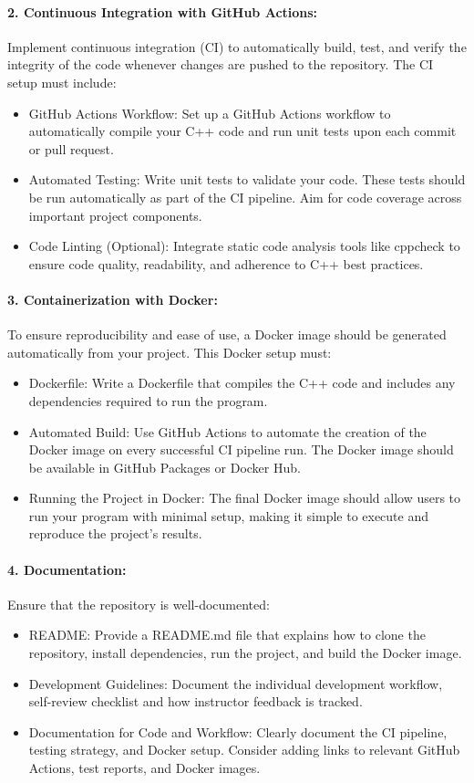 \documentclass[11pt,a4paper]{article}
\begin{document}
\paragraph{2. Continuous Integration with GitHub Actions:}
Implement continuous integration (CI) to automatically build, test, and verify the integrity of the code whenever changes are pushed to the repository. The CI setup must include:
\begin{itemize}
\item GitHub Actions Workflow: Set up a GitHub Actions workflow to automatically compile your C++ code and run unit tests upon each commit or pull request.
\item Automated Testing: Write unit tests to validate your code. These tests should be run automatically as part of the CI pipeline. Aim for code coverage across important project components.
\item Code Linting (Optional): Integrate static code analysis tools like cppcheck to ensure code quality, readability, and adherence to C++ best practices.
\end{itemize}

\paragraph{3. Containerization with Docker:}
To ensure reproducibility and ease of use, a Docker image should be generated automatically from your project. This Docker setup must:
\begin{itemize}
\item Dockerfile: Write a Dockerfile that compiles the C++ code and includes any dependencies required to run the program.
\item Automated Build: Use GitHub Actions to automate the creation of the Docker image on every successful CI pipeline run. The Docker image should be available in GitHub Packages or Docker Hub.
\item Running the Project in Docker: The final Docker image should allow users to run your program with minimal setup, making it simple to execute and reproduce the project’s results.
\end{itemize}

\paragraph{4. Documentation:}
Ensure that the repository is well-documented:
\begin{itemize}
\item README: Provide a README.md file that explains how to clone the repository, install dependencies, run the project, and build the Docker image.
\item Development Guidelines: Document the individual development workflow, self-review checklist and how instructor feedback is tracked.
\item Documentation for Code and Workflow: Clearly document the CI pipeline, testing strategy, and Docker setup. Consider adding links to relevant GitHub Actions, test reports, and Docker images.
\end{itemize}
\end{document}
